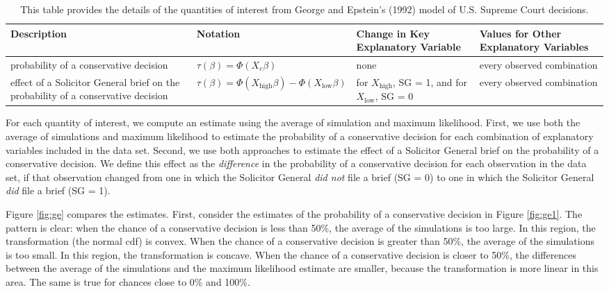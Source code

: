 \documentclass[11pt]{article}
\begin{document}
\begin{table}[h!]
\centering
\caption{This table provides the details of the quantities of interest from George and Epstein's (1992) model of U.S. Supreme Court decisions.}
\label{tab:ge-qi}
\footnotesize
\begin{tabular}{@{} m{5cm} m{4cm} m{2.5cm}m{4cm}@{}}
\toprule
Description                                                                       & Notation                                                  & Change in Key Explanatory Variable               & Values for Other Explanatory Variables \\ \midrule
probability of a conservative decision                                            & $\tau(\beta) = \Phi(X_c \beta)$                           & none                                             & every observed combination   \\\hline
effect of a Solicitor General brief on the probability of a conservative decision & $\tau(\beta) = \Phi(X_\text{high} \beta) - \Phi(X_\text{low}\beta)$ & for $X_\text{high}$, SG = 1, and for $X_\text{low}$, SG = 0 & every observed combination   \\ \bottomrule
\end{tabular}
\end{table}

For each quantity of interest, we compute an estimate using the average of simulation and maximum likelihood.
First, we use both the average of simulations and maximum likelihood to estimate the probability of a conservative decision for each combination of explanatory variables included in the data set.
Second, we use both approaches to estimate the effect of a Solicitor General brief on the probability of a conservative decision.
We define this effect as the \textit{difference} in the probability of a conservative decision for each observation in the data set, if that observation changed from one in which the Solicitor General \emph{did not} file a brief (SG = 0) to one in which the Solicitor General \emph{did} file a brief (SG = 1).

Figure \ref{fig:ge} compares the estimates.
First, consider the estimates of the probability of a conservative decision in Figure \ref{fig:ge1}.
The pattern is clear: when the chance of a conservative decision is less than 50\%, the average of the simulations is too large.
In this region, the transformation (the normal cdf) is convex.
When the chance of a conservative decision is greater than 50\%, the average of the simulations is too small.
In this region, the transformation is concave.
When the chance of a conservative decision is closer to 50\%, the differences between the average of the simulations and the maximum likelihood estimate are smaller, because the transformation is more linear in this area.
The same is true for chances close to 0\% and 100\%.
\end{document}
